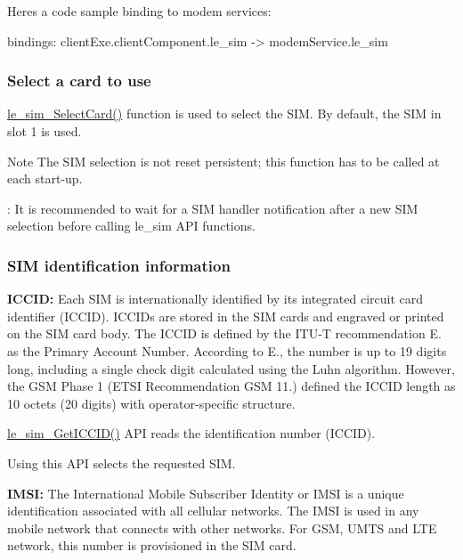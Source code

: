 Here\textquotesingle{}s a code sample binding to modem services\+: \begin{DoxyVerb}bindings:
{
   clientExe.clientComponent.le_sim -> modemService.le_sim
}
\end{DoxyVerb}
\hypertarget{c_sim_le_sim_SelectCard}{}\subsubsection{Select a card to use}\label{c_sim_le_sim_SelectCard}
\hyperlink{le__sim__interface_8h_a91a0f0399c89e466b9a8ccfab6de129d}{le\+\_\+sim\+\_\+\+Select\+Card()} function is used to select the S\+I\+M. By default, the S\+I\+M in slot 1 is used. \begin{DoxyNote}{Note}
The S\+I\+M selection is not reset persistent; this function has to be called at each start-\/up.

\+: It is recommended to wait for a S\+I\+M handler notification after a new S\+I\+M selection before calling le\+\_\+sim A\+P\+I functions.
\end{DoxyNote}
\hypertarget{c_sim_le_sim_id}{}\subsubsection{S\+I\+M identification information}\label{c_sim_le_sim_id}
{\bfseries I\+C\+C\+I\+D\+:} Each S\+I\+M is internationally identified by its integrated circuit card identifier (I\+C\+C\+I\+D). I\+C\+C\+I\+Ds are stored in the S\+I\+M cards and engraved or printed on the S\+I\+M card body. The I\+C\+C\+I\+D is defined by the I\+T\+U-\/\+T recommendation E. as the Primary Account Number. According to E., the number is up to 19 digits long, including a single check digit calculated using the Luhn algorithm. However, the G\+S\+M Phase 1 (E\+T\+S\+I Recommendation G\+S\+M 11.) defined the I\+C\+C\+I\+D length as 10 octets (20 digits) with operator-\/specific structure.

\hyperlink{le__sim__interface_8h_a90cbc71edc9bee227502f3836f5fa117}{le\+\_\+sim\+\_\+\+Get\+I\+C\+C\+I\+D()} A\+P\+I reads the identification number (I\+C\+C\+I\+D).

Using this A\+P\+I selects the requested S\+I\+M.

{\bfseries I\+M\+S\+I\+:} The International Mobile Subscriber Identity or I\+M\+S\+I is a unique identification associated with all cellular networks. The I\+M\+S\+I is used in any mobile network that connects with other networks. For G\+S\+M, U\+M\+T\+S and L\+T\+E network, this number is provisioned in the S\+I\+M card.

